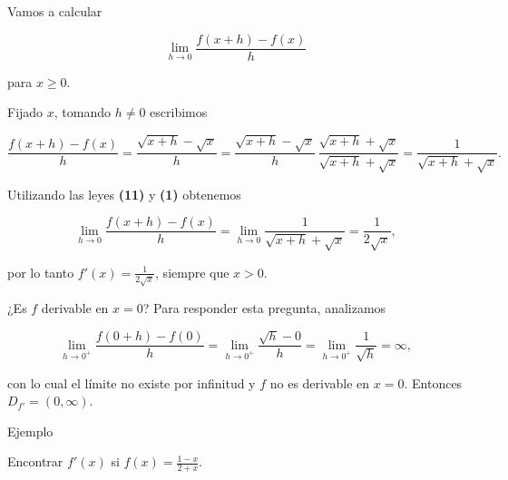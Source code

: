 \documentclass[
  letterpaper,
]{book}
\theoremstyle{plain}
\theoremstyle{remark}
\begin{document}
\begin{tcolorbox}[enhanced jigsaw, opacityback=0, left=2mm, opacitybacktitle=0.6, toprule=.15mm, bottomrule=.15mm, colbacktitle=quarto-callout-tip-color!10!white, titlerule=0mm, bottomtitle=1mm, title=\textcolor{quarto-callout-tip-color}{\faLightbulb}\hspace{0.5em}{Solución}, toptitle=1mm, colframe=quarto-callout-tip-color-frame, colback=white, breakable, rightrule=.15mm, arc=.35mm, leftrule=.75mm, coltitle=black]

Vamos a calcular

\[
\lim_{h\to 0} \frac{f(x+h)-f(x)}{h}
\]

para \(x\geq 0\).

Fijado \(x\), tomando \(h\neq 0\) escribimos

\[
\frac{f(x+h)-f(x)}{h}=\frac{\sqrt{x+h}-\sqrt{x}}{h}=\frac{\sqrt{x+h}-\sqrt{x}}{h}\,\frac{\sqrt{x+h}+\sqrt{x}}{\sqrt{x+h}+\sqrt{x}}=\frac{1}{\sqrt{x+h}+\sqrt{x}}.
\]

Utilizando las leyes \textbf{(11)} y \textbf{(1)} obtenemos

\[
\lim_{h\to 0} \frac{f(x+h)-f(x)}{h}=\lim_{h\to 0} \frac{1}{\sqrt{x+h}+\sqrt{x}}=\frac{1}{2\sqrt{x}},
\]

por lo tanto \(f'(x)=\displaystyle \frac{1}{2\sqrt{x}}\), siempre que
\(x>0\).

¿Es \(f\) derivable en \(x=0\)? Para responder esta pregunta, analizamos

\[
\lim_{h\to 0^+} \frac{f(0+h)-f(0)}{h}=\lim_{h\to 0^+} \frac{\sqrt{h}-0}{h}=\lim_{h\to 0^+} \frac{1}{\sqrt{h}}=\infty,
\]

con lo cual el límite no existe por infinitud y \(f\) no es derivable en
\(x=0\). Entonces \(D_{f'}=(0,\infty)\).

\end{tcolorbox}

Ejemplo

Encontrar \(f'(x)\) si \(\displaystyle f(x)=\frac{1-x}{2+x}\).
\end{document}
